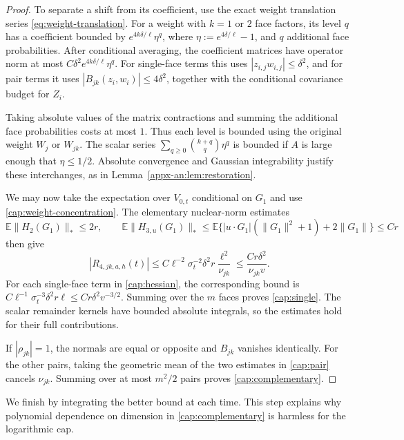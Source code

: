 \documentclass[11pt,letterpaper]{article}
\theoremstyle{remark}
\newcommand{\E}{\mathbb E}
\begin{document}
\begin{proof}
To separate a shift from its coefficient, use the exact weight
translation series \eqref{eq:weight-translation}. For a weight
with \(k=1\) or \(2\) face factors, its level \(q\) has a
coefficient bounded by \(e^{4k\delta/\ell}\eta^q\), where
\(\eta:=e^{4\delta/\ell}-1\), and \(q\) additional face
probabilities. After conditional averaging, the coefficient
matrices have operator norm at most
\(C\delta^2e^{4k\delta/\ell}\eta^q\). For single-face terms this
uses \(|z_{i,j}w_{i,j}|\le\delta^2\), and for pair terms it uses
\(|B_{jk}(z_i,w_i)|\le4\delta^2\), together with the conditional
covariance budget for \(Z_i\).

Taking absolute values of the matrix contractions and summing the
additional face probabilities costs at most \(1\). Thus each
level is bounded using the original weight \(W_j\) or \(W_{jk}\).
The scalar series
\(\sum_{q\ge0}\binom{k+q}{q}\eta^q\) is bounded if \(A\) is
large enough that \(\eta\le1/2\). Absolute convergence and
Gaussian integrability justify these interchanges, as in
Lemma~\ref{appx-an:lem:restoration}.

We may now take the expectation over \(V_{0,t}\) conditional on
\(G_1\) and use \eqref{cap:weight-concentration}. The elementary
nuclear-norm estimates
\[
 \E\|H_2(G_1)\|_*\le2r,\qquad
 \E\|H_{3,u}(G_1)\|_*
 \le\E\{|u\cdot G_1|(\|G_1\|^2+1)+2\|G_1\|\}\le Cr
\]
then give
\[
 |R_{4,jk,a,h}(t)|
 \le C\ell^{-2}\sigma_t^{-2}\delta^2r
                    \frac{\ell^2}{\nu_{jk}}
 \le\frac{Cr\delta^2}{\nu_{jk}v}.
\]
For each single-face term in \eqref{cap:hessian}, the corresponding
bound is
\(C\ell^{-1}\sigma_t^{-3}\delta^2r\ell
 \le Cr\delta^2v^{-3/2}\).
Summing over the \(m\) faces proves \eqref{cap:single}.
The scalar remainder kernels have bounded absolute integrals, so
the estimates hold for their full contributions.

If \(|\rho_{jk}|=1\), the normals are equal or opposite and
\(B_{jk}\) vanishes identically. For the other pairs, taking the
geometric mean of the two estimates in \eqref{cap:pair} cancels
\(\nu_{jk}\). Summing over at most \(m^2/2\) pairs proves
\eqref{cap:complementary}.
\end{proof}

We finish by integrating the better bound at each time. This step
explains why polynomial dependence on dimension in
\eqref{cap:complementary} is harmless for the logarithmic cap.
\end{document}
